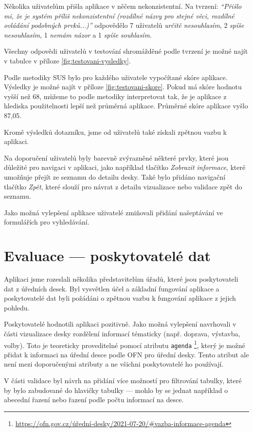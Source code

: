 Několika uživatelům přišla aplikace v něčem nekonzistentní. Na tvrzení: \textit{``Přišlo mi, že je systém příliš nekonzistentní (rozdílné názvy pro stejné věci, rozdílné ovládání podobných prvků...)''} odpovědělo 7 uživatelů \textit{určitě nesouhlasím}, 2 \textit{spíše nesouhlasím}, 1 \textit{nemám názor} a 1 \textit{spíše souhlasím}.

Všechny odpovědi uživatelů v testování shromážděné podle tvrzení je možné najít v tabulce v příloze \ref{fig:testovani-vysledky}. 

Podle metodiky SUS bylo pro každého uživatele vypočítané skóre aplikace. Výsledky je možné najít v příloze \ref{fig:testovani-skore}. Pokud má skóre hodnotu vyšší než 68, můžeme to podle metodiky interpretovat tak, že je aplikace z hlediska použitelnosti lepší než průměrná aplikace. Průměrné skóre aplikace vyšlo 87,05.

Kromě výsledků dotazníku, jsme od uživatelů také získali zpětnou vazbu k aplikaci.

Na doporučení uživatelů byly barevně zvýrazněné některé prvky, které jsou důležité pro navigaci v aplikaci, jako například tlačítko \textit{Zobrazit informace}, které umožňuje přejít ze seznamu do detailu desky. Také bylo přidáno navigační tlačítko \textit{Zpět}, které slouží pro návrat z detailu vizualizace nebo validace zpět do seznamu.

Jako možná vylepšení aplikace uživatelé zmiňovali přidání našeptávání ve formulářích pro vyhledávání.

\section{Evaluace --- poskytovatelé dat}

Aplikaci jsme rozeslali několika představitelům úřadů, které jsou poskytovateli dat z úředních desek. Byl vysvětlen účel a základní fungování aplikace a poskytovatelé dat byli požádáni o zpětnou vazbu k fungování aplikace z jejich pohledu.

Poskytovatelé hodnotili aplikaci pozitivně. Jako možná vylepšení navrhovali v části vizualizace desky rozdělení informací tématicky (např. doprava, výstavba, volby). Toto je teoreticky proveditelné pomocí atributu \texttt{agenda} \footnote{\url{https://ofn.gov.cz/úřední-desky/2021-07-20/\#vazba-informace-agenda}}, který je možné přidat k informaci na úřední desce podle OFN pro úřední desky. Tento atribut ale není mezi doporučenými atributy a ne všichni poskytovatelé ho používají.

V části validace byl návrh na přidání více možností pro filtrování tabulky, které by bylo zabudované do hlavičky tabulky --- mohlo by se jednat například o abecední řazení nebo řazení podle počtu informací na desce. 

